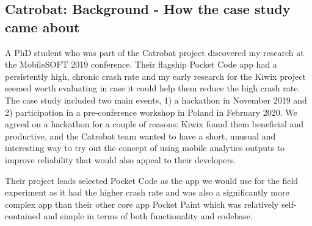 \subsection{Catrobat: Background - How the case study came about}
A PhD student who was part of the Catrobat project discovered my research at the MobileSOFT 2019 conference. Their flagship Pocket Code app had a persistently high, chronic crash rate and my early research for the Kiwix project seemed worth evaluating in case it could help them reduce the high crash rate. The case study included two main events, 1) a hackathon in November 2019 and 2) participation in a pre-conference workshop in Poland in February 2020. We agreed on a hackathon for a couple of reasons: Kiwix found them beneficial and productive, and the Catrobat team wanted to have a short, unusual and interesting way to try out the concept of using mobile analytics outputs to improve reliability that would also appeal to their developers. 

Their project leads selected Pocket Code as the app we would use for the field experiment as it had the higher crash rate and was also a significantly more complex app than their other core app Pocket Paint which was relatively self-contained and simple in terms of both functionality and codebase.


